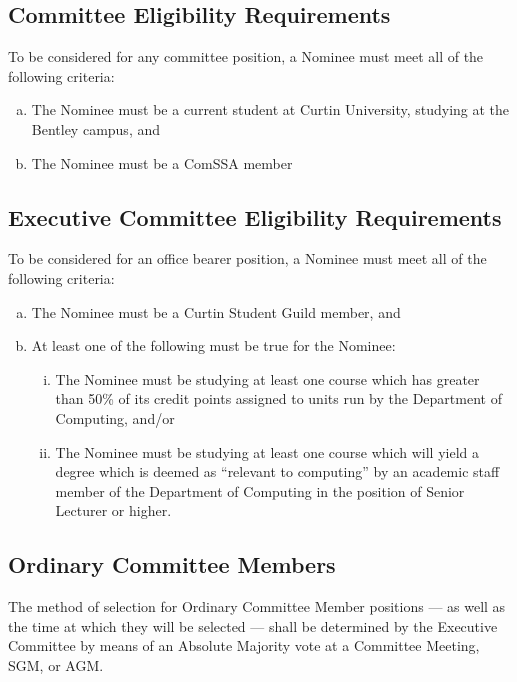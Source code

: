 \documentclass[a4paper,12pt]{article}
\begin{document}
\subsection{Committee Eligibility Requirements}
\label{committee_eligibility}

To be considered for any committee position, a Nominee must meet all of the following criteria:

\begin{enumerate}[a)]
	\item The Nominee must be a current student at Curtin University, studying at the Bentley campus, and
	\item The Nominee must be a ComSSA member
\end{enumerate}

\subsection{Executive Committee Eligibility Requirements}
\label{exec_committee_eligibility}

To be considered for an office bearer position, a Nominee must meet all of the following criteria:

\begin{enumerate}[a)]
	\item The Nominee must be a Curtin Student Guild member, and
	\item At least one of the following must be true for the Nominee:
	\begin{enumerate}[i)]
		\item The Nominee must be studying at least one course which has greater than 50\% of its credit points assigned to units run by the Department of Computing, and/or
		\item The Nominee must be studying at least one course which will yield a degree which is deemed as ``relevant to computing'' by an academic staff member of the Department of Computing in the position of Senior Lecturer or higher.
	\end{enumerate}
\end{enumerate}

\subsection{Ordinary Committee Members}

The method of selection for Ordinary Committee Member positions --- as well as the time at which they will be selected --- shall be determined by the Executive Committee by means of an Absolute Majority vote at a Committee Meeting, SGM, or AGM.
\end{document}

